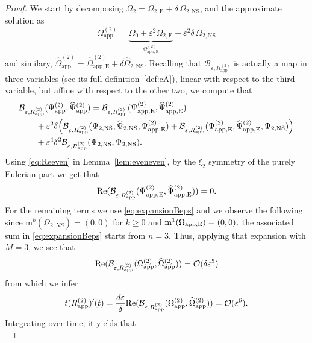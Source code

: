 \documentclass[11pt,reqno,a4paper]{amsart}
\def\eps{\varepsilon}
\def\Re{{\rm Re}}
\newcommand{\cB}{\mathcal{B}}
\newcommand{\cO}{\mathcal{O}}
\newcommand{\mrm}{\mathrm{m}}
\newcommand{\1}{\mathbbm{1}}
\theoremstyle{definition}
\theoremstyle{definition}
\numberwithin{equation}{section}
\newcommand{\Mapp}[2]{#1^{(#2)}_\mathrm{app}}
\newcommand{\Mappp}[3]{#1^{(#2)}_\mathrm{app,#3}}
\begin{document}
\begin{proof}
We start by decomposing $\Omega_2 = \Omega_{2,\mathrm{E}} + \delta\, \Omega_{2,\mathrm{NS}}$, and the approximate solution as \begin{equation}
    \Mapp{\Omega}{2} = \underbrace{\Omega_0 + \eps^2 \Omega_{2,\mathrm{E}}}_{\Mappp{\Omega}{2}{E}} + \eps^2\delta \, \Omega_{2,\mathrm{NS}}
\end{equation}
and similary, $\Mapp{\widehat{\Omega}}{2} = \Mappp{\widehat{\Omega}}{2}{E} + \delta\widehat{\Omega}_{2,\mathrm{NS}}$.
Recalling that $\cB_{\eps,\Mapp{R}{2}}$ is actually a map in three variables (see its full definition~\cref{def:cA}), linear with respect to the third variable, but affine with respect to the other two, we compute that
\begin{align}
    &\cB_{\eps,\Mapp{R}{2}}(\Mapp{\Psi}{2},\Mapp{\widehat{\Psi}}{2}) = \cB_{\eps,\Mapp{R}{2}}(\Mappp{\Psi}{2}{E},\Mappp{\widehat{\Psi}}{2}{E}) \\
     &\qquad + \eps^2\delta \Big( \cB_{\eps,\Mapp{R}{2}}(\Psi_{2,\mathrm{NS}},\widehat{\Psi}_{2,\mathrm{NS}},\Mappp{\Psi}{2}{E}) + \cB_{\eps,\Mapp{R}{2}}(\Mappp{\Psi}{2}{E},\Mappp{\widehat{\Psi}}{2}{E},\Psi_{2,\mathrm{NS}})\Big)  \\
    &\qquad + \eps^4\delta^2\cB_{\eps,\Mapp{R}{2}}(\Psi_{2,{\rm NS}},\Psi_{2,{\rm NS}}).
\end{align}
Using \cref{eq:Reeven} in Lemma~\ref{lem:eveneven}, by the $\xi_2$ symmetry of the purely Eulerian part we get that
\begin{equation}
    \Re(\cB_{\eps,\Mapp{R}{2}}(\Mappp{\Psi}{2}{E},\Mappp{\widehat{\Psi}}{2}{E})) = 0.
\end{equation}
For the remaining terms we use \cref{eq:expansionBeps} and we observe the following: since $\mrm^k(\Omega_{2,NS})=(0,0)$ for $k\geq 0$ and $\mrm^1(\Omega_{\rm app,E})=(0,0),$ the associated sum in \cref{eq:expansionBeps} starts from $n=3$. Thus, applying that expansion with $M=3$, we see that
\begin{equation}
    \Re(\cB_{\eps,\Mapp{R}{2}}(\Mapp{\Omega}{2},\Mapp{\widehat{\Omega}}{2})) = \cO(\delta\eps^5)
\end{equation}
from which we infer  
\begin{equation}
    t (\Mapp{R}{2})'(t) = \frac{d \eps}{\delta} \Re(\cB_{\eps,\Mapp{R}{2}}(\Mapp{\Omega}{2},\Mapp{\widehat{\Omega}}{2})) = \cO(\eps^6).
\end{equation}
Integrating over time, it yields that
\begin{equation}

\end{equation}
\end{proof}
\end{document}
